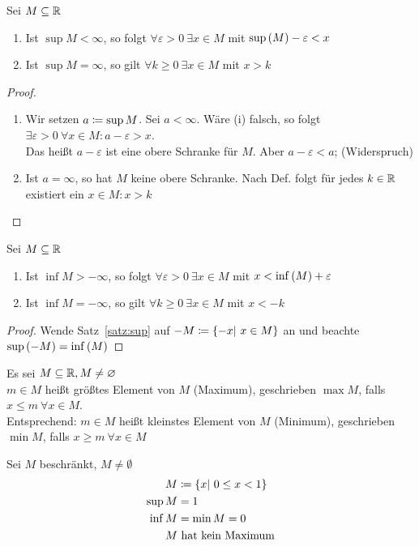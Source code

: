 \begin{satz}
    \label{satz:sup}
    Sei $M\subseteq \mathbb{R}$
    \begin{enumerate}[label=(\roman*)]
        \item Ist $\sup M < \infty$, so folgt $\forall \varepsilon > 0~\exists x\in M$ mit $\sup\left(M\right) -\varepsilon < x$
        \item Ist $\sup M = \infty$, so gilt $\forall k\geq 0~\exists x\in M$ mit $x> k$
    \end{enumerate}
    \begin{proof}
        \theoremescape
        \begin{enumerate}
            \item Wir setzen $a\coloneqq \sup M$. Sei $a<\infty$. Wäre (i) falsch, so folgt $\exists \varepsilon>0~\forall x\in M:a-\varepsilon > x$.\\Das heißt $a-\varepsilon$ ist eine obere Schranke für $M$. Aber $a-\varepsilon < a$; (Widerspruch)
            \item Ist $a=\infty$, so hat $M$ keine obere Schranke. Nach Def. folgt für jedes $k\in\mathbb{R}$ existiert ein $x\in M: x > k$\qedhere
        \end{enumerate}
    \end{proof}
\end{satz}
\begin{satz}
    \label{satz:inf}
    Sei $M\subseteq \mathbb{R}$
    \begin{enumerate}[label=(\roman*)]
        \item Ist $\inf M > -\infty$, so folgt $\forall \varepsilon > 0~\exists x\in M$ mit $x < \inf\left(M\right)+ \varepsilon$
        \item Ist $\inf M = -\infty$, so gilt $\forall k\geq 0~\exists x\in M$ mit $x< -k$
    \end{enumerate}
    \begin{proof}
        Wende Satz~\ref{satz:sup} auf $-M\coloneqq\left\{-x|~x\in M\right\}$ an und beachte $\sup\left(-M\right) = \inf\left(M\right)$
    \end{proof}
\end{satz}
\begin{definition}
    Es sei $M\subseteq \mathbb{R}, M\neq\varnothing$\\
    $m\in M$ heißt größtes Element von $M$ (Maximum), geschrieben $\max M$, falls $x\leq m~\forall x\in M$.\\
    Entsprechend: $m\in M$ heißt kleinstes Element von $M$ (Minimum), geschrieben $\min M$, falls $x\geq m~\forall x\in M$
\end{definition}

\begin{beispiel}
    Sei $M$ beschränkt, $M\neq\emptyset$
    \begin{align*}
        M&\coloneqq\left\{x|~0\leq x< 1\right\}\\
        \sup M &= 1\\
        \inf M &= \min M = 0\\
        M&\text{ hat kein Maximum}
    \end{align*}
\end{beispiel}

\newpage